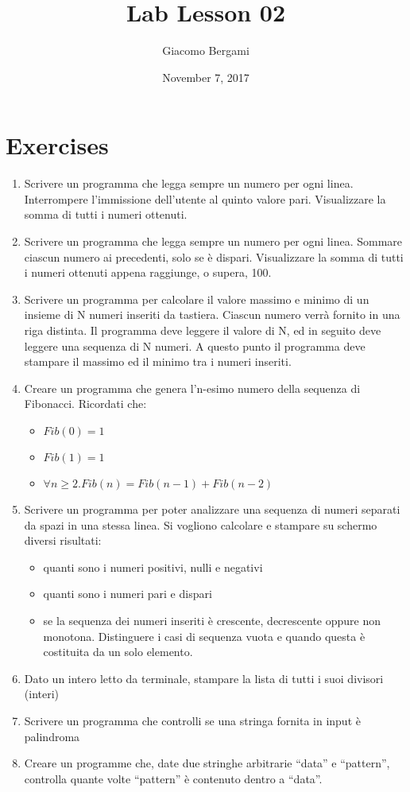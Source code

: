 \documentclass[]{scrartcl}
\title{Lab Lesson 02}
\date{November 7, 2017}
\author{Giacomo Bergami}
\begin{document}
\maketitle
\section*{Exercises}

\begin{enumerate}
\item Scrivere un programma che legga sempre un numero per ogni linea.
Interrompere l'immissione dell'utente al quinto valore pari.
Visualizzare la somma di tutti i numeri ottenuti.
\item Scrivere un programma che legga sempre un numero per ogni linea.
Sommare ciascun numero ai precedenti, solo se è dispari.
Visualizzare la somma di tutti i numeri ottenuti appena raggiunge, o supera, 100.
\item Scrivere un programma per calcolare il valore massimo e minimo di un insieme
di N numeri inseriti da tastiera. Ciascun numero verrà fornito in una riga distinta.
Il programma deve leggere il valore di N, ed in
seguito deve leggere una sequenza di N numeri. A questo punto il programma
deve stampare il massimo ed il minimo tra i numeri inseriti.
\item Creare un programma che genera l'n-esimo numero della sequenza di Fibonacci. Ricordati che:
\begin{itemize}
	\item $Fib(0) = 1$
	\item $Fib(1) = 1$
	\item $\forall n\geq 2. Fib(n) = Fib(n-1)+Fib(n-2)$
\end{itemize}
\item Scrivere un programma per poter analizzare una sequenza di numeri separati da spazi in una stessa linea.
Si vogliono calcolare e stampare su schermo diversi risultati:
\begin{itemize}
	\item quanti sono i numeri positivi, nulli e negativi
	\item  quanti sono i numeri pari e dispari
	\item  se la sequenza dei numeri inseriti è crescente, decrescente oppure non monotona. Distinguere i casi di sequenza vuota e quando questa è costituita da un solo elemento.
\end{itemize}

\item Dato un intero letto da terminale, stampare la lista di tutti i suoi divisori (interi)
\item Scrivere un programma che controlli se una stringa fornita in input è palindroma
\item Creare un programme che, date due stringhe arbitrarie ``data'' e ``pattern'', controlla quante volte ``pattern'' è contenuto dentro a ``data''.


\end{enumerate}
\end{document}
